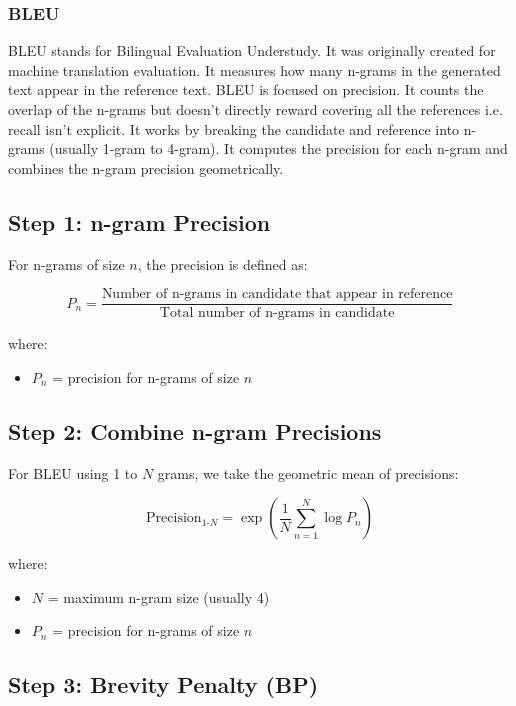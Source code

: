 \subsubsection{BLEU}
BLEU stands for Bilingual Evaluation Understudy. It was originally created for machine translation evaluation. It measures how many n-grams in the generated text appear in the reference text. BLEU is focused on precision. It counts the overlap of the n-grams but doesn't directly reward covering all the references i.e. recall isn't explicit. It works by breaking the candidate and reference into n-grams (usually 1-gram to 4-gram). It computes the precision for each n-gram and combines the n-gram precision geometrically.

\subsection*{Step 1: n-gram Precision}

For n-grams of size $n$, the precision is defined as:

\begin{equation}
P_n = \frac{\text{Number of n-grams in candidate that appear in reference}}{\text{Total number of n-grams in candidate}}
\end{equation}

\noindent where:
\begin{itemize}
    \item $P_n$ = precision for n-grams of size $n$
\end{itemize}

\subsection*{Step 2: Combine n-gram Precisions}

For BLEU using 1 to $N$ grams, we take the geometric mean of precisions:

\begin{equation}
\text{Precision}_{1\text{-}N} = \exp \left( \frac{1}{N} \sum_{n=1}^{N} \log P_n \right)
\end{equation}

\noindent where:
\begin{itemize}
    \item $N$ = maximum n-gram size (usually 4)
    \item $P_n$ = precision for n-grams of size $n$
\end{itemize}

\subsection*{Step 3: Brevity Penalty (BP)}

